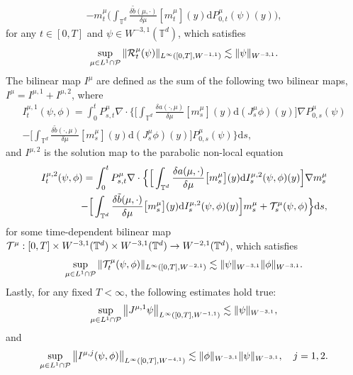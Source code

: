 \begin{lem}
\begin{equation}
\begin{split}
 - m^{\mu}_t   \Big(\int_{\mathbb{T}^d}\frac{\delta \tilde{b}(\mu, \cdot)}{\delta\mu}[m_t^{\mu}](y)\mathrm{d}P^{\mu}_{0,t} (\psi)(y)\Big),
\end{split}
\end{equation}
for any $t \in [0,T]$ and $\psi \in  W^{-3,1}(\mathbb{T}^d)$, which satisfies 
\[
\sup_{\mu \in L^1 \cap \mathcal{P}} \|\mathcal{R}_t^{\mu}(\psi)\|_{L^\infty([0,T],W^{-1,1})} \lesssim \|\psi\|_{W^{-3,1}}.
\]
The bilinear map $I^{\mu}$ are defined as the sum of the following two bilinear maps, $I^{\mu} = I^{\mu,1} + I^{\mu,2}$, where 
\begin{equation}\label{eq:I1}
\begin{split}
I_t^{\mu,1}(\psi,\phi) = \int_0^t P^{\mu}_{s,t}\nabla \cdot \Big\{ \Big[\int_{\mathbb{T}^d}\frac{\delta a(\cdot, \mu)}{\delta \mu}[m^{\mu}_s](y) \mathrm{d}(J_s^{\mu}\phi)(y)\Big] \nabla P_{0,s}^{\mu}(\psi) \\
 - \Big[\int_{\mathbb{T}^d}\frac{\delta \tilde{b}(\cdot, \mu)}{\delta \mu}[m^{\mu}_s](y) \mathrm{d}(J_s^{\mu}\phi)(y)\Big] P_{0,s}^{\mu}(\psi)\Big\}\mathrm{d}s,
\end{split}
\end{equation}
and $I^{\mu,2}$ is the solution map to the parabolic non-local equation
\begin{equation}\label{eq:I2}
\begin{split}
I_{t}^{\mu,2}(\psi,\phi)  
= \int_0^t P^{\mu}_{s,t}\nabla \cdot \Big\{ \Big[ \int_{\mathbb{T}^d} \frac{\delta a(\mu, \cdot)}{\delta\mu}\big[m_s^{\mu}\big](y)  \mathrm{d}I_{s}^{\mu,2}(\psi,\phi) (y)\Big]  \nabla m_s^{\mu}\\
 -   \Big[\int_{\mathbb{T}^d} \frac{\delta \tilde{b}(\mu, \cdot)}{\delta\mu}\big[m_s^{\mu}\big](y) \mathrm{d}I_{s}^{\mu,2}(\psi,\phi) (y)\Big]  m_s^{\mu} + \mathcal{T}^{\mu}_s(\psi,\phi)\Big\}\mathrm{d}s,
\end{split}
\end{equation}
for some time-dependent bilinear map $\mathcal{T}^{\mu}: [0,T] \times W^{-3,1}(\mathbb{T}^d) \times W^{-3,1}(\mathbb{T}^d)  \to W^{-2,1}(\mathbb{T}^d)$, which satisfies
\[
\sup_{\mu \in L^1 \cap \mathcal{P}}\|\mathcal{T}^{\mu}_t(\psi, \phi)\|_{L^\infty([0,T],W^{-2,1})} \lesssim \|\psi\|_{W^{-3,1}} \|\phi\|_{W^{-3,1}}.
\]
Lastly, for any fixed $T < \infty$, the following estimates hold true:
\begin{equation}\label{eq:reg_Jmu1}
\sup_{\mu \in L^1 \cap \mathcal{P}}\big\|J^{\mu,1}\psi\big\|_{L^{\infty}([0,T], W^{-1, 1})} \lesssim \|\psi\|_{W^{-3, 1}},
\end{equation}
and 
\begin{equation}\label{eq:reg_Imu}
\sup_{\mu \in L^1 \cap \mathcal{P}}\big\|I^{\mu,j}(\psi,\phi)\big\|_{L^{\infty}([0,T], W^{-4, 1})} \lesssim \|\phi\|_{W^{-3, 1}}\|\psi\|_{W^{-3, 1}}, \quad j = 1,2.
\end{equation}
\end{lem}


